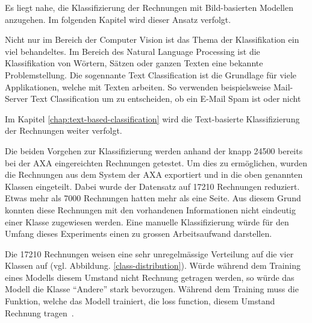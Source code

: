 
Es liegt nahe, die Klassifizierung der Rechnungen mit Bild-basierten Modellen anzugehen. Im folgenden Kapitel wird dieser Ansatz verfolgt.

Nicht nur im Bereich der Computer Vision ist das Thema der Klassifikation ein viel behandeltes. Im Bereich des Natural Language Processing ist die Klassifikation von Wörtern, Sätzen oder ganzen Texten eine bekannte Problemstellung. Die sogennante Text Classification ist die Grundlage für viele Applikationen, welche mit Texten arbeiten. So verwenden beispielsweise Mail-Server Text Classification um zu entscheiden, ob ein E-Mail Spam ist oder nicht~\autocite{https://developers.google.com/machine-learning/guides/text-classification/}

Im Kapitel \autoref{chap:text-based-classification} wird die Text-basierte Klassifizierung der Rechnungen weiter verfolgt.

Die beiden Vorgehen zur Klassifizierung werden anhand der knapp 24500 bereits bei der AXA eingereichten Rechnungen getestet. Um dies zu ermöglichen, wurden die Rechnungen aus dem System der AXA exportiert und in die oben genannten Klassen eingeteilt. Dabei wurde der Datensatz auf 17210 Rechnungen reduziert. Etwas mehr als 7000 Rechnungen hatten mehr als eine Seite. Aus diesem Grund konnten diese Rechnungen mit den vorhandenen Informationen nicht eindeutig einer Klasse zugewiesen werden. Eine manuelle Klassifizierung würde für den Umfang dieses Experiments einen zu grossen Arbeitsaufwand darstellen.

Die 17210 Rechnungen weisen eine sehr unregelmässige Verteilung auf die vier Klassen auf (vgl. Abbildung. \ref{class-distribution}). Würde während dem Training eines Modells diesem Umstand nicht Rechnung getragen werden, so würde das Modell die Klasse \enquote{Andere} stark bevorzugen. Während dem Training muss die Funktion, welche das Modell trainiert, die loss function, diesem Umstand Rechnung tragen~\autocite{TODO TODO TODO}.


